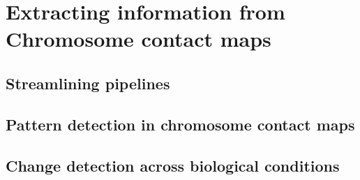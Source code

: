 
\chapter{Extracting information from Chromosome contact maps} %

\label{ch:02-01} %


\section{Streamlining pipelines}

\section{Pattern detection in chromosome contact maps}

\section{Change detection across biological conditions}
\blindtext